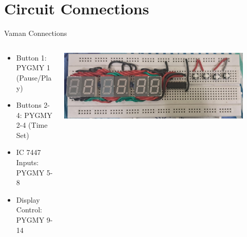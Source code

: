 \documentclass{beamer}
\begin{document}
\section{Circuit Connections}
\begin{frame}{Vaman Connections}
    \begin{columns}
        \begin{column}{0.5\textwidth}
            \begin{itemize}
                \item Button 1: PYGMY 1 (Pause/Play)
                \item Buttons 2-4: PYGMY 2-4 (Time Set)
                \item IC 7447 Inputs: PYGMY 5-8
                \item Display Control: PYGMY 9-14
            \end{itemize}
        \end{column}
        \begin{column}{0.5\textwidth}
            \centering
            \includegraphics[width=0.9\textwidth]{figs/clock.jpeg}
        \end{column}
    \end{columns}
\end{frame}
\end{document}
